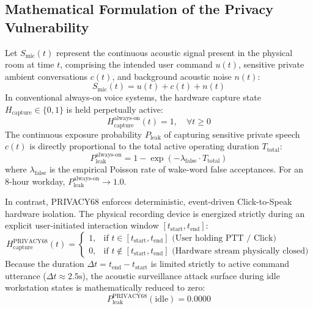 \subsection{Mathematical Formulation of the Privacy Vulnerability}
Let $S_{\text{mic}}(t)$ represent the continuous acoustic signal present in the physical room at time $t$, comprising the intended user command $u(t)$, sensitive private ambient conversations $c(t)$, and background acoustic noise $n(t)$:
\begin{equation}
    S_{\text{mic}}(t) = u(t) + c(t) + n(t)
\end{equation}
In conventional always-on voice systems, the hardware capture state $H_{\text{capture}} \in \{0, 1\}$ is held perpetually active:
\begin{equation}
    H_{\text{capture}}^{\text{always-on}}(t) = 1, \quad \forall t \ge 0
\end{equation}
The continuous exposure probability $P_{\text{leak}}$ of capturing sensitive private speech $c(t)$ is directly proportional to the total active operating duration $T_{\text{total}}$:
\begin{equation}
    P_{\text{leak}}^{\text{always-on}} = 1 - \exp\left(-\lambda_{\text{false}} \cdot T_{\text{total}}\right)
\end{equation}
where $\lambda_{\text{false}}$ is the empirical Poisson rate of wake-word false acceptances. For an 8-hour workday, $P_{\text{leak}}^{\text{always-on}} \to 1.0$.

In contrast, PRIVACY68 enforces deterministic, event-driven Click-to-Speak hardware isolation. The physical recording device is energized strictly during an explicit user-initiated interaction window $[t_{\text{start}}, t_{\text{end}}]$:
\begin{equation}
    H_{\text{capture}}^{\text{PRIVACY68}}(t) = 
    \begin{cases} 
      1, & \text{if } t \in [t_{\text{start}}, t_{\text{end}}] \text{ (User holding PTT / Click)} \\
      0, & \text{if } t \notin [t_{\text{start}}, t_{\text{end}}] \text{ (Hardware stream physically closed)}
    \end{cases}
\end{equation}
Because the duration $\Delta t = t_{\text{end}} - t_{\text{start}}$ is limited strictly to active command utterance ($\Delta t \approx 2.5\text{s}$), the acoustic surveillance attack surface during idle workstation states is mathematically reduced to zero:
\begin{equation}
    P_{\text{leak}}^{\text{PRIVACY68}}(\text{idle}) = 0.0000
\end{equation}

